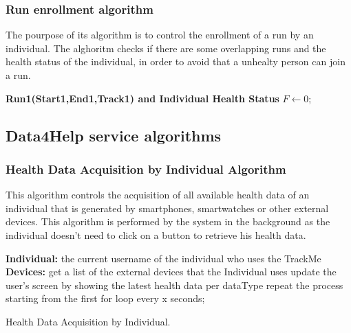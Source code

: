 \documentclass[12pt]{article}
\begin{document}
\subsubsection{Run enrollment algorithm}  

The pourpose of its algorithm is to control the enrollment of a run by an individual. The alghoritm checks if there are some overlapping runs and the health status of the individual, in order to avoid that a unhealty person can join a run. 

\begin{algorithm} 
\textbf{Run1(Start1,End1,Track1) and Individual Health Status} \;
$F \leftarrow 0;$ \;


\end{algorithm}

\subsection{Data4Help service algorithms}

\subsubsection{Health Data Acquisition by Individual Algorithm}

This algorithm controls the acquisition of all available health data of an individual that is generated by 
smartphones, smartwatches or other external devices. This algorithm is performed by the system in the 
background as the individual doesn't need to click on a button to retrieve his health data.
\vspace{10mm}

\begin{algorithm}[H]
 \textbf{Individual:} the current username of the individual who uses the TrackMe\;
 \noindent \textbf{Devices:} get a list of the external devices that the Individual uses\;
 \noindent {}
 \noindent {}
    update the user's screen by showing the latest health data per dataType\;\vspace{1mm}
    repeat the process starting from the first for loop every x seconds;
 \vspace{5mm}
 \caption{Health Data Acquisition by Individual.}
\end{algorithm}
\end{document}
